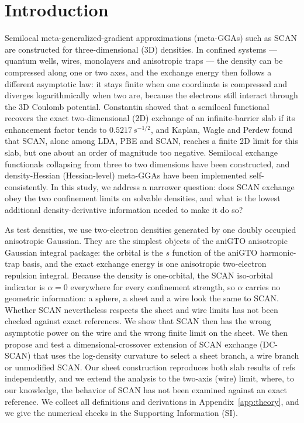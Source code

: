 \documentclass[journal=jctcce,manuscript=article]{achemso}
\newcommand{\novelty}[1]{{\color{red}#1}}
\begin{document}
\section{Introduction}
\label{sec:intro}
Semilocal meta-generalized-gradient approximations (meta-GGAs) such as
SCAN\cite{sun2015strongly} are constructed for three-dimensional (3D)
densities.  In confined systems --- quantum wells, wires, monolayers and
anisotropic traps --- the density can be compressed along one or two axes, and
the exchange energy then follows a different asymptotic law: it stays finite
when one coordinate is compressed and diverges logarithmically when two are,
because the electrons still interact through the 3D Coulomb potential.
\novelty{Constantin showed that a semilocal functional recovers the exact two-dimensional
(2D) exchange of an infinite-barrier slab if its enhancement factor tends to
$0.5217\,s^{-1/2}$\cite{constantin2008dimensional}, and Kaplan, Wagle and Perdew
found that SCAN, alone among LDA, PBE and SCAN, reaches a finite 2D limit for this
slab, but one about an order of magnitude too negative\cite{kaplan2018collapse}.}
Semilocal exchange functionals collapsing from three to two dimensions have
been constructed\cite{horowitz2023collapsing}, and density-Hessian (Hessian-level)
meta-GGAs have been implemented self-consistently\cite{dabbaghi2026hessian}.
In this study, we address a narrower question: does SCAN exchange obey the two
confinement limits on solvable densities, and what is the lowest additional
density-derivative information needed to make it do so?

As test densities, we use two-electron densities generated by one doubly
occupied anisotropic Gaussian.  They are the simplest objects of the aniGTO
anisotropic Gaussian integral package\cite{chirchir2026anigto}: the orbital is
the $s$ function of the aniGTO harmonic-trap basis, and the exact exchange
energy is one anisotropic two-electron repulsion integral.  Because the
density is one-orbital, the SCAN iso-orbital indicator is $\alpha=0$
everywhere for every confinement strength, so $\alpha$ carries no geometric
information: a sphere, a sheet and a wire look the same to SCAN.  Whether SCAN
nevertheless respects the sheet and wire limits has not been checked against
exact references.  We show that SCAN then has the wrong asymptotic power on the
wire and the wrong finite limit on the sheet.  We then propose and test a
dimensional-crossover extension of SCAN exchange (DC-SCAN) that uses the
log-density curvature to select a sheet branch, a wire branch or unmodified
SCAN.  \novelty{Our sheet construction reproduces both slab results of
refs~\citenum{constantin2008dimensional,kaplan2018collapse} independently, and we
extend the analysis to the two-axis (wire) limit, where, to our knowledge, the
behavior of SCAN has not been examined against an exact reference.}  We collect all
definitions and derivations in Appendix~\ref{app:theory}, and we give the numerical checks in the
Supporting Information (SI).
\end{document}
